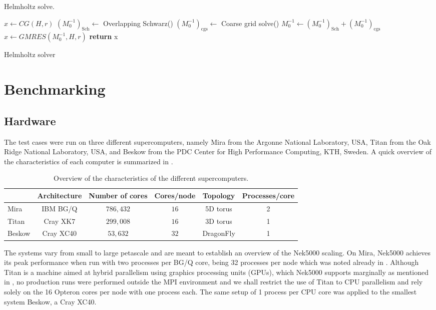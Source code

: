 \documentclass{sig-alternate}
\begin{document}
\begin{algorithm}
\caption{Helmholtz solve.}
\begin{algorithmic}
\State $x \leftarrow CG(H, r)$
\State $\left(M_0^{-1}\right)_{\text{Sch}} \leftarrow$ Overlapping Schwarz()
\State $\left(M_0^{-1}\right)_{\text{cgs}} \leftarrow$ Coarse grid solve() 
\State $M_0^{-1} \leftarrow \left(M_0^{-1}\right)_{\text{Sch}} + \left(M_0^{-1}\right)_{\text{cgs}}$
\State $x \leftarrow GMRES(M_0^{-1}, H, r)$
\EndIf
\State \textbf{return} x
\EndProcedure
\end{algorithmic}\label{alg:helmholtz}
\caption{Helmholtz solver}
\end{algorithm}

\section{Benchmarking}
\label{sec:benchmarking}

\subsection{Hardware}
\label{sec:hardware}

The test cases were run on three different supercomputers, namely Mira from the
Argonne National Laboratory, USA, Titan from the Oak Ridge National Laboratory,
USA, and Beskow from the PDC Center for High Performance Computing, KTH, Sweden.
A quick overview of the characteristics of each computer is summarized in 
.
\begin{table}
\centering
\caption{Overview of the characteristics of the different supercomputers.}
\begin{tabular}{l|ccccc} 
\hline
 & Architecture & Number of cores & Cores/node & Topology & Processes/core \\
 \hline
Mira   & IBM BG/Q  & $786,432$ & $16$ & 5D torus  &2\\ 
Titan  & Cray XK7  & $299,008$ & $16$ & 3D torus  &1\\ 
Beskow & Cray XC40 & $53,632$  & $32$ & DragonFly &1\\
\hline
\end{tabular}
\label{tab:computer_charac}
\end{table}
The systems vary from small to large petascale and are meant to establish an overview of the Nek5000 scaling. On Mira, Nek5000 achieves its
peak performance when run with two processes per BG/Q core, being 32 processes
per node which was noted already in \cite{fischer:scaling}. Although Titan is a
machine aimed at hybrid parallelism using graphics processing units (GPUs), which
Nek5000 supports marginally as mentioned in \cite{Otten2016}, no production runs
were performed outside the MPI environment and we shall restrict the use of
Titan to CPU parallelism and rely solely
on the 16 Opteron cores per node with one process each. The same setup of 1
process per CPU core was applied to the smallest system Beskow, a Cray XC40.
\end{document}
